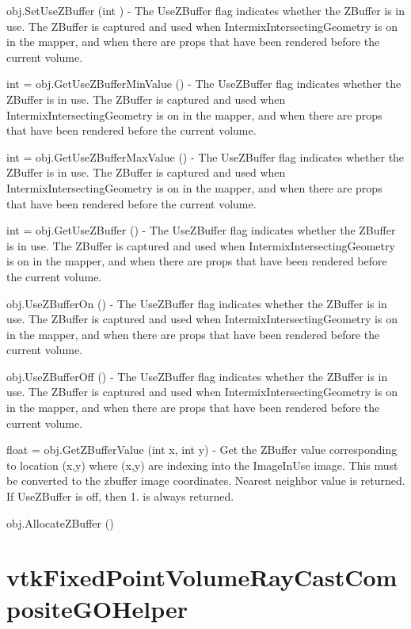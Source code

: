 \begin{DoxyItemize}
\item {\ttfamily obj.\-Set\-Use\-Z\-Buffer (int )} -\/ The Use\-Z\-Buffer flag indicates whether the Z\-Buffer is in use. The Z\-Buffer is captured and used when Intermix\-Intersecting\-Geometry is on in the mapper, and when there are props that have been rendered before the current volume.  
\item {\ttfamily int = obj.\-Get\-Use\-Z\-Buffer\-Min\-Value ()} -\/ The Use\-Z\-Buffer flag indicates whether the Z\-Buffer is in use. The Z\-Buffer is captured and used when Intermix\-Intersecting\-Geometry is on in the mapper, and when there are props that have been rendered before the current volume.  
\item {\ttfamily int = obj.\-Get\-Use\-Z\-Buffer\-Max\-Value ()} -\/ The Use\-Z\-Buffer flag indicates whether the Z\-Buffer is in use. The Z\-Buffer is captured and used when Intermix\-Intersecting\-Geometry is on in the mapper, and when there are props that have been rendered before the current volume.  
\item {\ttfamily int = obj.\-Get\-Use\-Z\-Buffer ()} -\/ The Use\-Z\-Buffer flag indicates whether the Z\-Buffer is in use. The Z\-Buffer is captured and used when Intermix\-Intersecting\-Geometry is on in the mapper, and when there are props that have been rendered before the current volume.  
\item {\ttfamily obj.\-Use\-Z\-Buffer\-On ()} -\/ The Use\-Z\-Buffer flag indicates whether the Z\-Buffer is in use. The Z\-Buffer is captured and used when Intermix\-Intersecting\-Geometry is on in the mapper, and when there are props that have been rendered before the current volume.  
\item {\ttfamily obj.\-Use\-Z\-Buffer\-Off ()} -\/ The Use\-Z\-Buffer flag indicates whether the Z\-Buffer is in use. The Z\-Buffer is captured and used when Intermix\-Intersecting\-Geometry is on in the mapper, and when there are props that have been rendered before the current volume.  
\item {\ttfamily float = obj.\-Get\-Z\-Buffer\-Value (int x, int y)} -\/ Get the Z\-Buffer value corresponding to location (x,y) where (x,y) are indexing into the Image\-In\-Use image. This must be converted to the zbuffer image coordinates. Nearest neighbor value is returned. If Use\-Z\-Buffer is off, then 1. is always returned.  
\item {\ttfamily obj.\-Allocate\-Z\-Buffer ()}  
\end{DoxyItemize}\hypertarget{vtkvolumerendering_vtkfixedpointvolumeraycastcompositegohelper}{}\section{vtk\-Fixed\-Point\-Volume\-Ray\-Cast\-Composite\-G\-O\-Helper}\label{vtkvolumerendering_vtkfixedpointvolumeraycastcompositegohelper}
